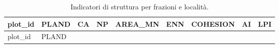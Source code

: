 \documentclass[
  a4paper,
]{book}
\begin{document}
\begin{longtable}[]{@{}
  >{\raggedright\arraybackslash}p{}
  >{\raggedleft\arraybackslash}p{}
  >{\raggedleft\arraybackslash}p{}
  >{\raggedleft\arraybackslash}p{}
  >{\raggedleft\arraybackslash}p{}
  >{\raggedleft\arraybackslash}p{}
  >{\raggedleft\arraybackslash}p{}
  >{\raggedleft\arraybackslash}p{}
  >{\raggedleft\arraybackslash}p{}@{}}
\caption{\label{tab:metricheFraz} Indicatori di struttura per frazioni e località.}\tabularnewline
\toprule\noalign{}
\begin{minipage}[b]{\linewidth}\raggedright
plot\_id
\end{minipage} & \begin{minipage}[b]{\linewidth}\raggedleft
PLAND
\end{minipage} & \begin{minipage}[b]{\linewidth}\raggedleft
CA
\end{minipage} & \begin{minipage}[b]{\linewidth}\raggedleft
NP
\end{minipage} & \begin{minipage}[b]{\linewidth}\raggedleft
AREA\_MN
\end{minipage} & \begin{minipage}[b]{\linewidth}\raggedleft
ENN
\end{minipage} & \begin{minipage}[b]{\linewidth}\raggedleft
COHESION
\end{minipage} & \begin{minipage}[b]{\linewidth}\raggedleft
AI
\end{minipage} & \begin{minipage}[b]{\linewidth}\raggedleft
LPI
\end{minipage} \\
\midrule\noalign{}
\endfirsthead
\toprule\noalign{}
\begin{minipage}[b]{\linewidth}\raggedright
plot\_id
\end{minipage} & \begin{minipage}[b]{\linewidth}\raggedleft
PLAND
\end{minipage} & \begin{minipage}[b]{\linewidth}\raggedleft

\end{minipage}
\end{longtable}
\end{document}
